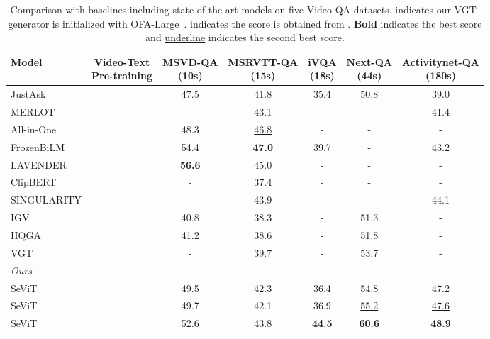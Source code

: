 \documentclass{article}
\newcommand{\cmark}{\ding{51}}\newcommand{\xmark}{\ding{55}}\DeclareMathOperator*{\argsort}{argsort}
\newcommand{\frameworkname}{SeViT}
\begin{document}
\begin{table*}[t!]
    \centering
    \small
    \caption{Comparison with baselines including state-of-the-art models on five Video QA datasets.  indicates our VGT-generator is initialized with OFA-Large~\cite{wang2022unifying}.  indicates the score is obtained from \citet{xiao2022videotransformer}. \textbf{Bold} indicates the best score and \underline{underline} indicates the second best score.}
    \vskip 0.15in
\begin{tabular}{lcccccc}
        \toprule
        Model & \makecell{Video-Text \\
        Pre-training} & \makecell{MSVD-QA \\ (10s)} & \makecell{MSRVTT-QA \\ (15s)} & \makecell{iVQA \\ (18s)}& \makecell{Next-QA \\ (44s)} & \makecell{Activitynet-QA \\ (180s)} \\
        \midrule
        JustAsk & \cmark & 47.5 & 41.8 & 35.4 & 50.8 & 39.0 \\
        MERLOT & \cmark & - & 43.1 & - & - & 41.4 \\
        All-in-One & \cmark & 48.3 & \underline{46.8} & - & - & - \\
        FrozenBiLM & \cmark & \underline{54.4} & \textbf{47.0} & \underline{39.7} & - & 43.2 \\
        LAVENDER& \cmark & \textbf{56.6} & 45.0 & - & - & - \\
        \midrule
        ClipBERT & \xmark & - & 37.4 & - & - & - \\
        SINGULARITY & \xmark & - & 43.9 & - & - & 44.1 \\
        IGV & \xmark & 40.8 & 38.3 & - & 51.3 & - \\
        HQGA & \xmark &  41.2 & 38.6 & - & 51.8 & - \\
        VGT & \xmark & - & 39.7 & - & 53.7 & - \\
        \midrule
        \textit{Ours} & & & & & & \\
\frameworkname{} & \xmark & 49.5 & 42.3 & 36.4 & 54.8 & 47.2 \\
\frameworkname{} & \xmark & 49.7 & 42.1 & 36.9 & \underline{55.2} & \underline{47.6} \\
\midrule
        \frameworkname{} & \xmark & 52.6 &  43.8 & \textbf{44.5} & \textbf{60.6} & \textbf{48.9} \\
        \bottomrule
    \end{tabular}
\label{table:main_result}
\end{table*} 
\end{document}
